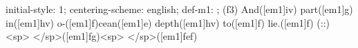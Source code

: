 initial-style: 1;
centering-scheme: english;
def-m1: \grealign;
(f3) And([em1]iv) part([em1]g) in([em1]hv) o-([em1]f)cean([em1]e) depth([em1]hv) to([em1]f) lie.([em1]f) (::) <sp> </sp>([em1]fg)<sp>   </sp>([em1]fef)